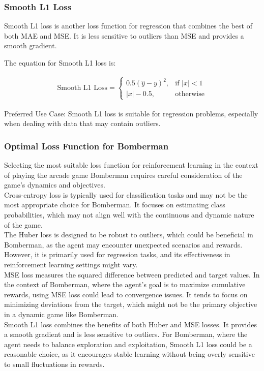 \subsubsection{Smooth L1 Loss}

Smooth L1 loss is another loss function for regression that combines the best of both MAE and MSE. It is less sensitive to outliers than MSE and provides a smooth gradient.

The equation for Smooth L1 loss is:

\begin{align}
	\text{Smooth L1 Loss} = \begin{cases}
		0.5(\hat{y} - y)^2, & \text{if } |x| < 1 \\
		|x| - 0.5, & \text{otherwise}
	\end{cases}    
\end{align}

Preferred Use Case: Smooth L1 loss is suitable for regression problems, especially when dealing with data that may contain outliers.

\subsubsection{Optimal Loss Function for Bomberman}

Selecting the most suitable loss function for reinforcement learning in the context of playing the arcade game Bomberman requires careful consideration of the game's dynamics and objectives.\\
Cross-entropy loss is typically used for classification tasks and may not be the most appropriate choice for Bomberman. It focuses on estimating class probabilities, which may not align well with the continuous and dynamic nature of the game. \\
The Huber loss is designed to be robust to outliers, which could be beneficial in Bomberman, as the agent may encounter unexpected scenarios and rewards. However, it is primarily used for regression tasks, and its effectiveness in reinforcement learning settings might vary. \\
MSE loss measures the squared difference between predicted and target values. In the context of Bomberman, where the agent's goal is to maximize cumulative rewards, using MSE loss could lead to convergence issues. It tends to focus on minimizing deviations from the target, which might not be the primary objective in a dynamic game like Bomberman. \\
Smooth L1 loss combines the benefits of both Huber and MSE losses. It provides a smooth gradient and is less sensitive to outliers. For Bomberman, where the agent needs to balance exploration and exploitation, Smooth L1 loss could be a reasonable choice, as it encourages stable learning without being overly sensitive to small fluctuations in rewards.
